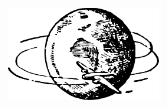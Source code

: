 \begin{center}
\includegraphics[width=0.3\textwidth]{figures/ch-09/fig-ch-09-tail.pdf}
\end{center}


















